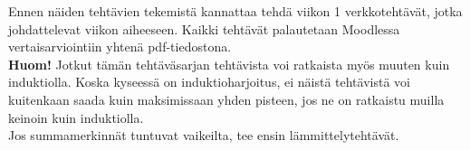 \documentclass[a4paper,12pt]{article}
\begin{document}
 

\otsikko

Ennen n\"aiden teht\"avien tekemist\"a kannattaa tehd\"a viikon 1 verkkoteht\"av\"at, jotka johdattelevat viikon aiheeseen.
Kaikki teht\"av\"at palautetaan Moodlessa vertaisarviointiin yhten\"a pdf-tiedostona. \\

\textbf{Huom!} Jotkut t\"am\"an teht\"av\"asarjan teht\"avista voi ratkaista my\"os muuten kuin induktiolla. Koska kyseess\"a on induktioharjoitus, ei n\"aist\"a teht\"avist\"a voi kuitenkaan saada kuin maksimissaan yhden pisteen, jos ne on ratkaistu muilla keinoin kuin induktiolla. \\

Jos summamerkinn\"at tuntuvat vaikeilta, tee ensin l\"ammittelyteht\"av\"at.
\end{document}
